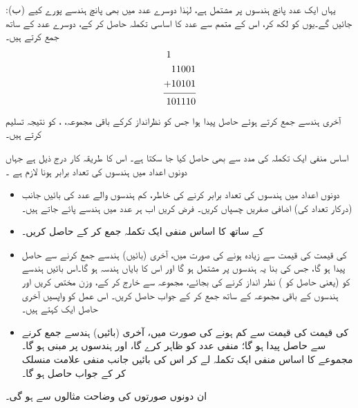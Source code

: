 :\quad  (ب) یہاں ایک عدد پانچ ہندسوں پر مشتمل  ہے،  لہٰذا دوسرے عدد  میں بھی  پانچ ہندسے پورے  کیے  جائیں گے۔یوں    کو  لکھ کر،  اس  کے   متمم 
  سے  عدد کا اساسی تکملہ  حاصل کر  کے،  دوسرے عدد کے ساتھ جمع کرتے ہیں۔
\begin{align*}
\begin{split}
1\phantom{11001}&\\
11001&\\
+10101&\\
\noalign{\smallskip}\hline\noalign{\smallskip}
101110&
\end{split}
\end{align*}
آخری ہندسے جمع کرتے ہوئے حاصل  پیدا ہوا جس کو نظرانداز کرکے  باقی مجموعہ،   ، کو نتیجہ  تسلیم کرتے  ہیں۔


اساس منفی ایک تکملہ  کی مدد سے بھی       حاصل کیا جا سکتا ہے۔ اس کا  طریقہ کار  درج ذیل ہے جہاں    دونوں اعداد میں ہندسوں کی تعداد برابر ہونا لازم ہے ۔
\begin{itemize}
    \item
     دونوں  اعداد میں ہندسوں کی تعداد   برابر  کرنے کی خاطر،  کم ہندسوں  والے   عدد کی بائیں جانب  (درکار تعداد کی) اضافی صفریں  چسپاں کریں۔ فرض کریں اب ہر عدد میں     ہندسے پائے جاتے ہیں۔ 
    \item
     کے ساتھ    کا اساس منفی ایک  تکملہ جمع کر کے       حاصل کریں۔
   \item
        کی قیمت    کی قیمت سے زیادہ ہونے کی صورت میں، آخری  (بائیں)  ہندسے جمع کرنے سے  حاصل   پیدا ہو  گا،        جس کی بنا  یہ    ہندسوں پر مشتمل  ہو گا اور اس کا  بایاں ہندسہ         ہو گا۔اس  بائیں ہندسے    کو (یعنی حاصل  کو )  نظر انداز کرنے کی بجائے،   مجموعہ سے خارج کر کے،   وزن مختص کریں اور   ہندسوں کے باقی مجموعہ کے ساتھ جمع کر کے جواب حاصل کریں۔ اس عمل کو واپسیں آخری حاصل ایک کہتے ہیں۔
    \item
{}کی قیمت   کی قیمت سے کم  ہونے کی صورت میں،  آخری  (بائیں)  ہندسے جمع کرنے سے  حاصل   پیدا    ہو  گا؛        منفی عدد کو ظاہر کرے گا، اور  ہندسوں  پر مبنی ہو گا۔مجموعے کا اساس منفی ایک  تکملہ لے کر اس کی بائیں جانب  منفی علامت  منسلک  کر کے  جواب  حاصل ہو گا۔
\end{itemize}
ان  دونوں صورتوں کی وضاحت مثالوں  سے ہو  گی۔ 

